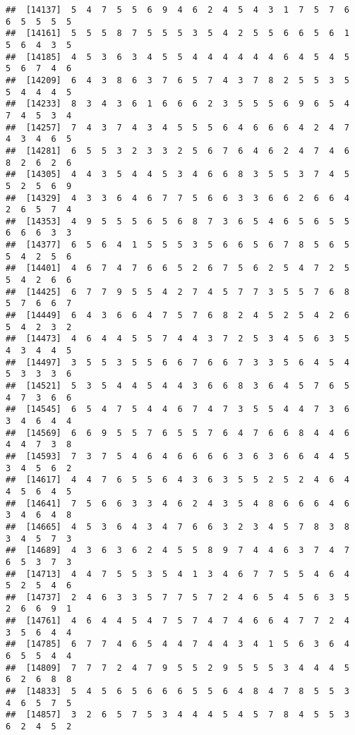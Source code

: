 \documentclass[
]{book}
\begin{document}
\begin{verbatim}
##  [14137]  5  4  7  5  5  6  9  4  6  2  4  5  4  3  1  7  5  7  6  6  5  5  5  5
##  [14161]  5  5  5  8  7  5  5  5  3  5  4  2  5  5  6  6  5  6  1  5  6  4  3  5
##  [14185]  4  5  3  6  3  4  5  5  4  4  4  4  4  4  6  4  5  4  5  5  6  7  4  6
##  [14209]  6  4  3  8  6  3  7  6  5  7  4  3  7  8  2  5  5  3  5  5  4  4  4  5
##  [14233]  8  3  4  3  6  1  6  6  6  2  3  5  5  5  6  9  6  5  4  7  4  5  3  4
##  [14257]  7  4  3  7  4  3  4  5  5  5  6  4  6  6  6  4  2  4  7  4  3  4  6  5
##  [14281]  6  5  5  3  2  3  3  2  5  6  7  6  4  6  2  4  7  4  6  8  2  6  2  6
##  [14305]  4  4  3  5  4  4  5  3  4  6  6  8  3  5  5  3  7  4  5  5  2  5  6  9
##  [14329]  4  3  3  6  4  6  7  7  5  6  6  3  3  6  6  2  6  6  4  2  6  5  7  4
##  [14353]  4  9  5  5  5  6  5  6  8  7  3  6  5  4  6  5  6  5  5  6  6  6  3  3
##  [14377]  6  5  6  4  1  5  5  5  3  5  6  6  5  6  7  8  5  6  5  5  4  2  5  6
##  [14401]  4  6  7  4  7  6  6  5  2  6  7  5  6  2  5  4  7  2  5  5  4  2  6  6
##  [14425]  6  7  7  9  5  5  4  2  7  4  5  7  7  3  5  5  7  6  8  5  7  6  6  7
##  [14449]  6  4  3  6  6  4  7  5  7  6  8  2  4  5  2  5  4  2  6  5  4  2  3  2
##  [14473]  4  6  4  4  5  5  7  4  4  3  7  2  5  3  4  5  6  3  5  4  3  4  4  5
##  [14497]  3  5  5  3  5  5  6  6  7  6  6  7  3  3  5  6  4  5  4  5  3  3  3  6
##  [14521]  5  3  5  4  4  5  4  4  3  6  6  8  3  6  4  5  7  6  5  4  7  3  6  6
##  [14545]  6  5  4  7  5  4  4  6  7  4  7  3  5  5  4  4  7  3  6  3  4  6  4  4
##  [14569]  6  6  9  5  5  7  6  5  5  7  6  4  7  6  6  8  4  4  6  4  4  7  3  8
##  [14593]  7  3  7  5  4  6  4  6  6  6  6  3  6  3  6  6  4  4  5  3  4  5  6  2
##  [14617]  4  4  7  6  5  5  6  4  3  6  3  5  5  2  5  2  4  6  4  4  5  6  4  5
##  [14641]  7  5  6  6  3  3  4  6  2  4  3  5  4  8  6  6  6  4  6  3  4  6  4  8
##  [14665]  4  5  3  6  4  3  4  7  6  6  3  2  3  4  5  7  8  3  8  3  4  5  7  3
##  [14689]  4  3  6  3  6  2  4  5  5  8  9  7  4  4  6  3  7  4  7  6  5  3  7  3
##  [14713]  4  4  7  5  5  3  5  4  1  3  4  6  7  7  5  5  4  6  4  5  2  5  4  6
##  [14737]  2  4  6  3  3  5  7  7  5  7  2  4  6  5  4  5  6  3  5  2  6  6  9  1
##  [14761]  4  6  4  4  5  4  7  5  7  4  7  4  6  6  4  7  7  2  4  3  5  6  4  4
##  [14785]  6  7  7  4  6  5  4  4  7  4  4  3  4  1  5  6  3  6  4  6  5  5  4  4
##  [14809]  7  7  7  2  4  7  9  5  5  2  9  5  5  5  3  4  4  4  5  6  2  6  8  8
##  [14833]  5  4  5  6  5  6  6  6  5  5  6  4  8  4  7  8  5  5  3  4  6  5  7  5
##  [14857]  3  2  6  5  7  5  3  4  4  4  5  4  5  7  8  4  5  5  3  6  2  4  5  2

\end{verbatim}
\end{document}
